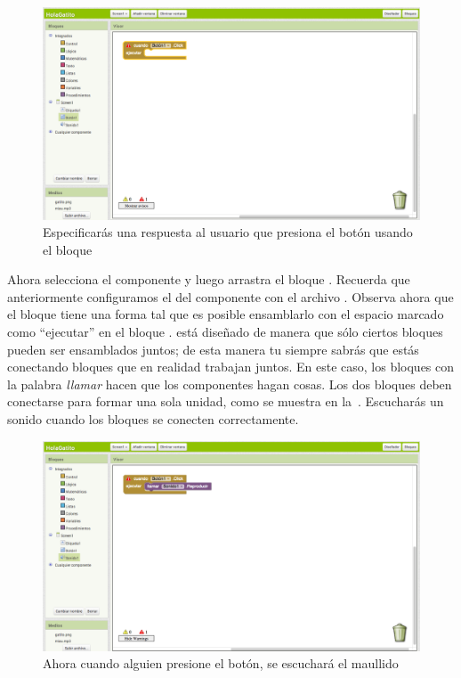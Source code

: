 \documentclass[letterpaper]{article}
\begin{document}
\begin{figure}[H]
\centering
\includegraphics[scale=0.25]{figures/button1ClickEmpty}
\caption{Especificarás una respuesta al usuario que presiona el botón
  usando el bloque }
\label{fig:button1ClickEmpty}
\end{figure}

Ahora selecciona el componente  y luego arrastra el
bloque . Recuerda que anteriormente
configuramos el  del componente con el archivo
. Observa ahora que el bloque  tiene una forma tal que es posible ensamblarlo
con el espacio marcado como ``ejecutar'' en el bloque
. \AppInventor está diseñado de manera que sólo
ciertos bloques pueden ser ensamblados juntos; de esta manera tu
siempre sabrás que estás conectando bloques que en realidad trabajan
juntos. En este caso, los bloques con la palabra \emph{llamar} hacen
que los componentes hagan cosas. Los dos bloques deben conectarse para
formar una sola unidad, como se muestra en
la~. Escucharás un sonido cuando los
bloques se conecten correctamente.

\begin{figure}[H]
\centering
\includegraphics[scale=0.25]{figures/button1ClickPlay}
\caption{Ahora cuando alguien presione el botón, se escuchará el maullido}
\label{fig:button1ClickPlay}
\end{figure}
\end{document}
